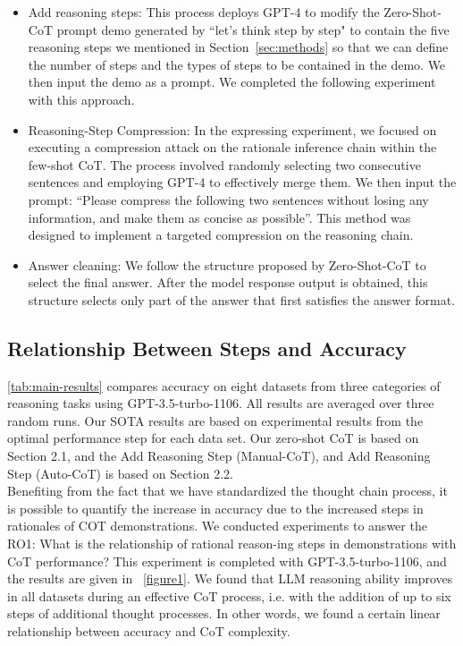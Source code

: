 \documentclass[11pt]{article}
\begin{document}
\begin{itemize}[leftmargin=*]\setlength\itemsep{-0.3em}
\item Add reasoning steps: This process deploys GPT-4 to modify the Zero-Shot-CoT prompt demo generated by ``let's think step by step" to contain the five reasoning steps we mentioned in Section~\ref{sec:methods} so that we can define the number of steps and the types of steps to be contained in the demo. We then input the demo as a prompt. We completed the following experiment with this approach.

\item Reasoning-Step Compression: In the expressing experiment, we focused on executing a compression attack on the rationale inference chain within the few-shot CoT. The process involved randomly selecting two consecutive sentences and employing GPT-4 to effectively merge them. We then input the prompt: ``Please compress the following two sentences without losing any information, and make them as concise as possible''. This method was designed to implement a targeted compression on the reasoning chain.

\item
Answer cleaning: We follow the structure proposed by Zero-Shot-CoT to select the final answer. After the model response output is obtained, this structure selects only part of the answer that first satisfies the answer format.

\end{itemize}


\phantom{Invisible Text}
\vspace{-\baselineskip}

\subsection{Relationship Between Steps and Accuracy}

\label{section4.2}
\autoref{tab:main-results} compares accuracy on eight datasets from three categories of reasoning tasks using GPT-3.5-turbo-1106. All results are averaged over three random runs. Our SOTA results are based on experimental results from the optimal performance step for each data set. Our zero-shot CoT is based on Section 2.1, and the Add Reasoning Step (Manual-CoT), and Add Reasoning Step (Auto-CoT) is based on Section 2.2.\\

Benefiting from the fact that we have standardized the thought chain process, it is possible to quantify the increase in accuracy due to the increased steps in rationales of COT demonstrations. We conducted experiments to answer the RO1: What is the relationship of rational reason-ing steps in demonstrations with CoT performance? This experiment is completed with GPT-3.5-turbo-1106, and the results are given in ~\autoref{figure1}. We found that LLM reasoning ability improves in all datasets during an effective CoT process, i.e. with the addition of up to six steps of additional thought processes. In other words, we found a certain linear relationship between accuracy and CoT complexity.
\end{document}
